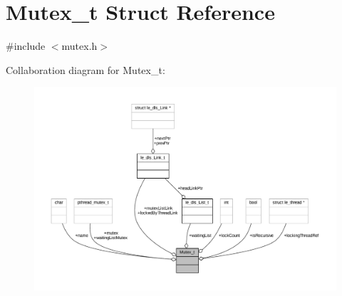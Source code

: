 \hypertarget{struct_mutex__t}{}\section{Mutex\+\_\+t Struct Reference}
\label{struct_mutex__t}


{\ttfamily \#include $<$mutex.\+h$>$}



Collaboration diagram for Mutex\+\_\+t\+:
\nopagebreak
\begin{figure}[H]
\begin{center}
\leavevmode
\includegraphics[width=350pt]{struct_mutex__t__coll__graph}
\end{center}
\end{figure}
